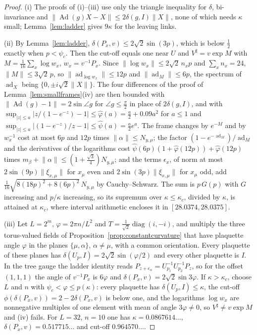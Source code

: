 \documentclass[11pt]{amsart}
\theoremstyle{definition}
\theoremstyle{remark}
\numberwithin{equation}{section}
\begin{document}
\begin{proof}
(i) The proofs of (i)--(iii) use only the triangle inequality for $\delta$,
bi-invariance and $\lVert\operatorname{Ad}(g)X-X\rVert\le2\delta(g,I)
\lVert X\rVert$, none of which needs $\kappa$ small; Lemma~\ref{lem:ladder}
gives $9\kappa$ for the leaving links.

(ii) By Lemma~\ref{lem:ladder}, $\delta(P_x,v)\le2\sqrt2\sin(3p)$, which is
below $\frac12$ exactly when $p<\psi_c$. Then the cut-off equals one near
$U$ and $V^\sharp=v\exp M$ with $M=\frac1{16}\sum_x\log w_x$, $w_x=v^{-1}P_x$.
Since $\lVert\log w_x\rVert\le2\sqrt2\,n_xp$ and $\sum_xn_x=24$,
$\lVert M\rVert\le3\sqrt2\,p$, so $\lVert\operatorname{ad}_{\log w_x}\rVert
\le12p$ and $\lVert\operatorname{ad}_M\rVert\le6p$, the spectrum of
$\operatorname{ad}_X$ being $\{0,\pm i\sqrt2\lVert X\rVert\}$. The four
differences of the proof of Lemma~\ref{lem:smallframes}(iv) are then
bounded with $\lVert\operatorname{Ad}(g)-1\rVert=2\sin\angle g$ for $\angle g
\le\frac\pi2$ in place of $2\delta(g,I)$, and with $\sup_{\lvert z\rvert\le a}
\lvert z/(1-e^{-z})-1\rvert\le\hat\varphi(a)=\frac a2+0.09a^2$ for $a\le1$ and
$\sup_{\lvert z\rvert\le a}\lvert(1-e^{-z})/z-1\rvert\le\hat\psi(a)=\frac a2e^a$.
The frame changes by $e^{-M}$ and by $w_x^{-1}$ cost at most $6p$ and
$12p$ times $\lVert\alpha\rVert\le N_{y,\mu}$; the factor
$(1-e^{-\operatorname{ad}_M})/\operatorname{ad}_M$ and the derivatives of the
logarithms cost $\hat\psi(6p)(1+\hat\varphi(12p))+\hat\varphi(12p)$ times
$m_\beta+\lVert\alpha\rVert\le(1+\frac{\sqrt3}4)N_{y,\mu}$; and the terms
$\epsilon_x$, of norm at most $2\sin(9p)\lVert\xi_{x,\mu}\rVert$ for $x_\mu$
even and $2\sin(3p)\lVert\xi_{x,\mu}\rVert$ for $x_\mu$ odd, add
$\frac1{16}\sqrt{8(18p)^2+8(6p)^2}\,N_{y,\mu}$ by Cauchy--Schwarz. The sum is $p\,G(p)$ with $G$ increasing and $p/\kappa$
increasing, so its supremum over $\kappa\le\kappa_c$, divided by $\kappa$, is
attained at $\kappa_c$, where interval arithmetic encloses it in
$[28.0374,28.0375]$.

(iii) Let $L=2^m$, $\varphi=2\pi n/L^2$ and $T=\frac1{\sqrt2}\operatorname{diag}
(i,-i)$, and multiply the three torus-valued fields of
Proposition~\ref{prop:constantcurvature} that have plaquette angle $\varphi$
in the planes $\{\mu,\alpha\}$, $\alpha\ne\mu$, with a common orientation.
Every plaquette of these planes has $\delta(U_p,I)=2\sqrt2\sin(\varphi/2)$
and every other plaquette is $I$. In the tree gauge the ladder identity
reads $P_{z+e_\alpha}=U_{p_1}^{-1}U_{p_2}^{-1}P_z$, so for the offset
$(1,1,1)$ the angle of $v^{-1}P_x$ is $6\varphi$ and $\delta(P_x,v)=2\sqrt2
\sin3\varphi$. If $\kappa>\kappa_c$, choose $L$ and $n$ with $\psi_c<\varphi
\le p(\kappa)$: every plaquette has $\delta(U_p,I)\le\kappa$, the cut-off
$\phi(\delta(P_x,v))=2-2\delta(P_x,v)$ is below one, and the logarithms
$\log w_x$ are nonnegative multiples of one element with mean of angle
$3\varphi\ne0$, so $V^\sharp\ne v\exp M$ and (iv) fails. For $L=32$,
$n=10$ one has $\kappa=0.0867614\ldots$, $\delta(P_x,v)=0.517715\ldots$ and
cut-off $0.964570\ldots$.


\end{proof}
\end{document}
